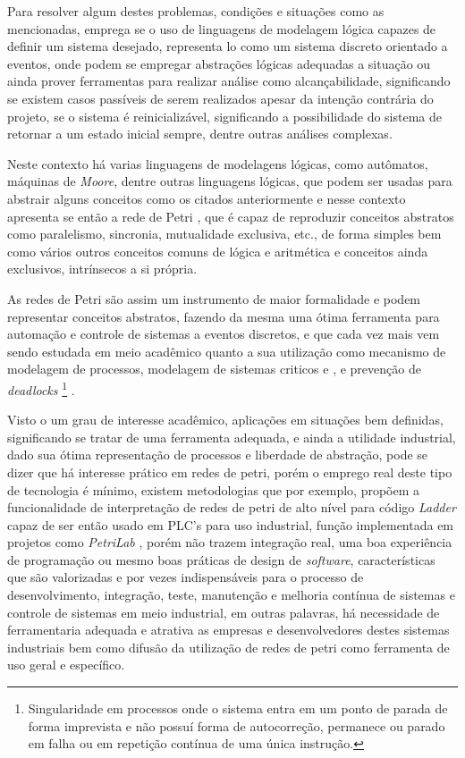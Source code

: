 Para resolver algum destes problemas, condições e situações como as mencionadas, emprega se o uso de linguagens de modelagem lógica capazes de definir um sistema desejado, representa lo como um sistema discreto orientado a eventos, onde podem se empregar abstrações lógicas adequadas a situação ou ainda prover ferramentas para realizar análise como alcançabilidade, significando se existem casos passíveis de serem realizados apesar da intenção contrária do projeto, se o sistema é reinicializável, significando a possibilidade do sistema de retornar a um estado inicial sempre, dentre outras análises complexas.

Neste contexto há varias linguagens de modelagens lógicas, como autômatos, máquinas de \textit{Moore}, dentre outras linguagens lógicas, que podem ser usadas para abstrair alguns conceitos como os citados anteriormente e nesse contexto apresenta se então a rede de Petri \cite{scholarpedia2011}, que é capaz de reproduzir conceitos abstratos como paralelismo, sincronia, mutualidade exclusiva, etc., de forma simples bem como vários outros conceitos comuns de lógica e aritmética e conceitos ainda exclusivos, intrínsecos a si própria. 

As redes de Petri são assim um instrumento de maior formalidade e podem representar conceitos abstratos, fazendo da mesma uma ótima ferramenta para automação e controle de sistemas a eventos discretos, e que cada vez mais vem sendo estudada em meio acadêmico quanto a sua utilização como mecanismo de modelagem de processos, modelagem de sistemas criticos \cite{1702225} e \cite{ghezzi1991unified}, e prevenção de \textit{deadlocks} \footnote{Singularidade em processos onde o sistema entra em um ponto de parada de forma imprevista e não possuí forma de autocorreção, permanece ou parado em falha ou em repetição contínua de uma única instrução.} \cite{kaid2015applications}.

Visto o um grau de interesse acadêmico, aplicações em situações bem definidas, significando se tratar de uma ferramenta adequada, e ainda a utilidade industrial, dado sua ótima representação de processos e liberdade de abstração, pode se dizer que há interesse prático em redes de petri, porém o emprego real deste tipo de tecnologia é mínimo, existem metodologias \cite{6621049} que por exemplo, propõem a funcionalidade de interpretação de redes de petri de alto nível para código \textit{Ladder} capaz de ser então usado em PLC's para uso industrial, função implementada em projetos como \textit{PetriLab} \cite{de2015petrilab}, porém não trazem integração real, uma boa experiência de programação ou mesmo boas práticas de design de \textit{software}, características que são valorizadas e por vezes indispensáveis para o processo de desenvolvimento, integração, teste, manutenção e melhoria contínua de sistemas e controle de sistemas em meio industrial, em outras palavras, há necessidade de ferramentaria adequada e atrativa as empresas e desenvolvedores destes sistemas industriais bem como difusão da utilização de redes de petri como ferramenta de uso geral e específico.

